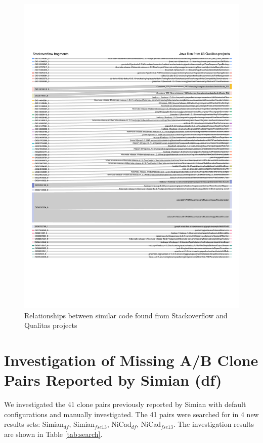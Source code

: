 \documentclass{IEEEtran}
\begin{document}
\begin{figure}[H]
	\centering
	\includegraphics[width=1\linewidth]{Sankey}
	\caption{Relationships between similar code found from Stackoverflow and Qualitas projects}
	\label{fig:sankey}
\end{figure}

\newpage

\section*{Investigation of Missing A/B Clone Pairs Reported by Simian (df)}
We investigated the 41 clone pairs previously reported by Simian with default configurations and manually investigated. The 41 pairs were searched for in 4 new results sets: Simian$_{df}$, Simian$_{fse13}$, NiCad$_{df}$, NiCad$_{fse13}$. The investigation results are shown in Table \ref{tab:search}.
\end{document}
